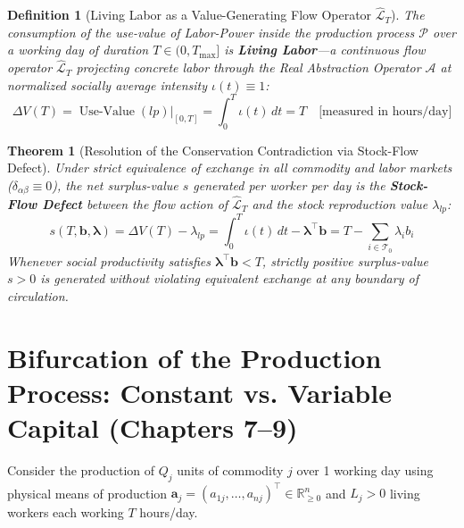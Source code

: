 \documentclass[11pt,a4paper]{article}
\newtheorem{definition}{Definition}[section]
\newtheorem{theorem}{Theorem}[section]
\begin{document}
\begin{definition}[Living Labor as a Value-Generating Flow Operator $\hat{\mathcal{L}}_T$]
The consumption of the use-value of Labor-Power inside the production process $\mathcal{P}$ over a working day of duration $T \in (0, T_{\max}]$ is \textbf{Living Labor}---a continuous flow operator $\hat{\mathcal{L}}_T$ projecting concrete labor through the Real Abstraction Operator $\mathcal{A}$ at normalized socially average intensity $\iota(t) \equiv 1$:
\begin{equation}
    \Delta V(T) = \operatorname{Use-Value}(lp)\big|_{[0, T]} = \int_0^T \iota(t) \, dt = T \quad \text{[measured in hours/day]}
\end{equation}
\end{definition}

\begin{theorem}[Resolution of the Conservation Contradiction via Stock-Flow Defect]
Under strict equivalence of exchange in all commodity and labor markets ($\delta_{\alpha \beta} \equiv 0$), the net surplus-value $s$ generated per worker per day is the \textbf{Stock-Flow Defect} between the flow action of $\hat{\mathcal{L}}_T$ and the stock reproduction value $\lambda_{lp}$:
\begin{equation}
    s(T, \mathbf{b}, \boldsymbol{\lambda}) = \Delta V(T) - \lambda_{lp} = \int_0^T \iota(t) \, dt - \boldsymbol{\lambda}^\top \mathbf{b} = T - \sum_{i \in \mathcal{T}_0} \lambda_i b_i
\end{equation}
Whenever social productivity satisfies $\boldsymbol{\lambda}^\top \mathbf{b} < T$, strictly positive surplus-value $s > 0$ is generated without violating equivalent exchange at any boundary of circulation.
\end{theorem}

\section{Bifurcation of the Production Process: Constant vs. Variable Capital (Chapters 7--9)}

Consider the production of $Q_j$ units of commodity $j$ over 1 working day using physical means of production $\mathbf{a}_j = (a_{1j}, \dots, a_{nj})^\top \in \mathbb{R}^n_{\ge 0}$ and $L_j > 0$ living workers each working $T$ hours/day.
\end{document}
